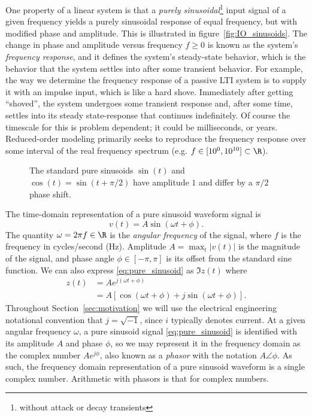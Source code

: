 One property of a linear system is that a \emph{purely sinusoidal}\footnote{without attack or decay transients} input  signal of a given frequency yields a purely sinusoidal response of equal frequency, but with modified phase and amplitude.   This is illustrated in figure~\ref{fig:IO_sinusoids}. The change in phase and amplitude versus frequency $f\geq0$ is known as the system's \emph{frequency response}, and it defines the system's steady-state behavior, which is the behavior that the system settles into after some transient behavior.   For example, the way we determine the frequency response of a passive  LTI system is to supply it with an impulse input, which is like a hard shove.  Immediately after getting ``shoved'', the system undergoes some transient response and, after some time, settles into its steady state-response that continues indefinitely.  Of course the timescale for this is problem dependent; it  could be milliseconds, or years.  Reduced-order modeling primarily seeks to reproduce the frequency response over some interval of the real frequency spectrum (e.g. $f\in[10^0,10^{10}]\subset\R$).  
\begin{figure}[ht]
\centering
{} 
\caption{The standard pure sinusoids $\sin(t)$ and $\cos(t)=\sin(t+\pi/2)$ have amplitude $1$ and differ by a $\pi/2$ phase shift.}
\label{fig:cos_sin}
\end{figure}

The time-domain representation of a pure sinusoid waveform signal is 
\begin{equation}
v(t) = A\sin(\omega t + \phi).
\label{eq:pure_sinusoid}
\end{equation}
The quantity $\omega=2\pi f\in\R$ is  the \emph{angular frequency}  of the signal, where $f$ is the frequency in cycles/second (Hz).  Amplitude $A=\max_t |v(t)|$ is the magnitude of the signal, and phase angle $\phi\in[-\pi,\pi]$ is its offset from the standard sine function.  We can also express \eqref{eq:pure_sinusoid} as $\Im z(t)$
where 
\begin{align}
z(t) &= Ae^{j(\omega t + \phi)}
\label{eq:Ae_wt}\\
&= A\left[\cos (\omega t+\phi) + j\sin(\omega t + \phi)\right].
\label{eq:complex_sinusoid}
\end{align}
 Throughout Section~\ref{sec:motivation} we will use the electrical engineering notational convention that $j=\sqrt{-1}$, since $i$ typically denotes current. 
At a given angular frequency $\omega$, a pure sinusoid signal \eqref{eq:pure_sinusoid} is identified with its amplitude $A$ and phase $\phi$, so we may represent it in the frequency domain as the complex number  $Ae^{j\phi}$,  also known as a \emph{phasor} with the notation $A\angle \phi$.  As such, the frequency domain representation of a pure sinusoid waveform is a single complex number.  Arithmetic with phasors is that for complex numbers.   

